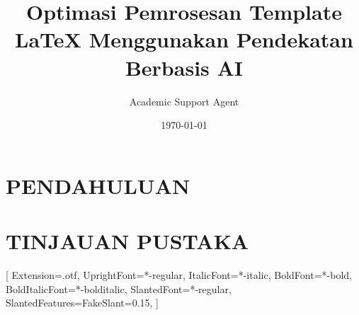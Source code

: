 \documentclass{scrartcl}
\title{Optimasi Pemrosesan Template LaTeX Menggunakan Pendekatan Berbasis AI}
\author{Academic Support Agent}
\date{\today}
\begin{document}
\maketitle

\begin{abstract}

\end{abstract}

\chapter{PENDAHULUAN}


\chapter{TINJAUAN PUSTAKA}



\usepackage[german,ngerman]{babel}
\usepackage{fontspec} 
 

\setmainfont{texgyrepagella}[
  Extension=.otf,
  UprightFont=*-regular,
  ItalicFont=*-italic,
  BoldFont=*-bold,
  BoldItalicFont=*-bolditalic,
  SlantedFont=*-regular,
  SlantedFeatures={FakeSlant=0.15},
]
\setsansfont{TeX Gyre Heros}
\usepackage{unicode-math}

 
\end{document}
